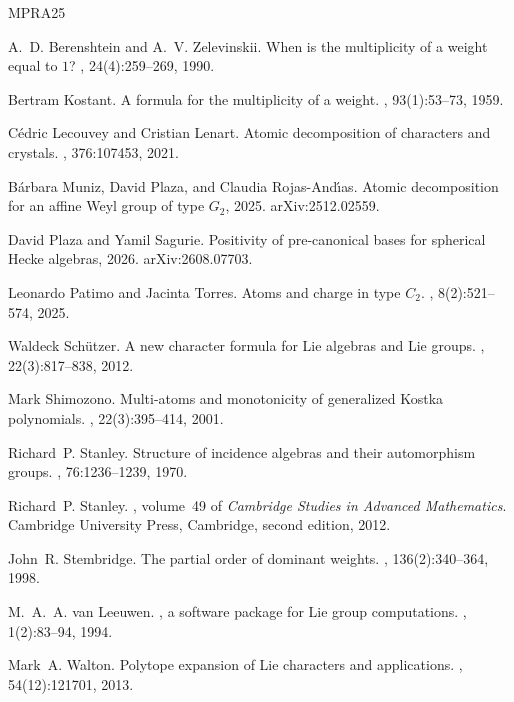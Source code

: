 \documentclass[11pt]{article}
\theoremstyle{definition}
\theoremstyle{remark}
\begin{document}
\begin{thebibliography}{MPRA25}

A.~D. Berenshtein and A.~V. Zelevinskii.
\newblock When is the multiplicity of a weight equal to {$1$}?
, 24(4):259--269, 1990.

Bertram Kostant.
\newblock A formula for the multiplicity of a weight.
, 93(1):53--73, 1959.

C{\'e}dric Lecouvey and Cristian Lenart.
\newblock Atomic decomposition of characters and crystals.
, 376:107453, 2021.

B{\'a}rbara Muniz, David Plaza, and Claudia Rojas-And{\'\i}as.
\newblock Atomic decomposition for an affine {Weyl} group of type {$G_2$},
  2025.
\newblock arXiv:2512.02559.

David Plaza and Yamil Sagurie.
\newblock Positivity of pre-canonical bases for spherical {Hecke} algebras,
  2026.
\newblock arXiv:2608.07703.

Leonardo Patimo and Jacinta Torres.
\newblock Atoms and charge in type {$C_2$}.
, 8(2):521--574, 2025.

Waldeck Sch{\"u}tzer.
\newblock A new character formula for {Lie} algebras and {Lie} groups.
, 22(3):817--838, 2012.

Mark Shimozono.
\newblock Multi-atoms and monotonicity of generalized {Kostka} polynomials.
, 22(3):395--414, 2001.

Richard~P. Stanley.
\newblock Structure of incidence algebras and their automorphism groups.
, 76:1236--1239, 1970.

Richard~P. Stanley.
, volume~49 of {\em
  Cambridge Studies in Advanced Mathematics}.
\newblock Cambridge University Press, Cambridge, second edition, 2012.

John~R. Stembridge.
\newblock The partial order of dominant weights.
, 136(2):340--364, 1998.

M.~A.~A. van Leeuwen.
, a software package for {Lie} group computations.
, 1(2):83--94, 1994.

Mark~A. Walton.
\newblock Polytope expansion of {Lie} characters and applications.
, 54(12):121701, 2013.

\end{thebibliography}
\end{document}
